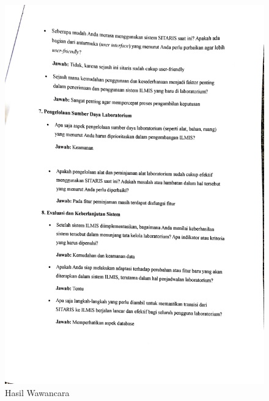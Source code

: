 \begin{figure}[h]
	\centering
	\includegraphics[width=0.82\linewidth]{konten/gambar/wawancara/wawancara_4.jpg}
	\caption{Hasil Wawancara}
	\label{fig:hasil-wawancara}
\end{figure}
